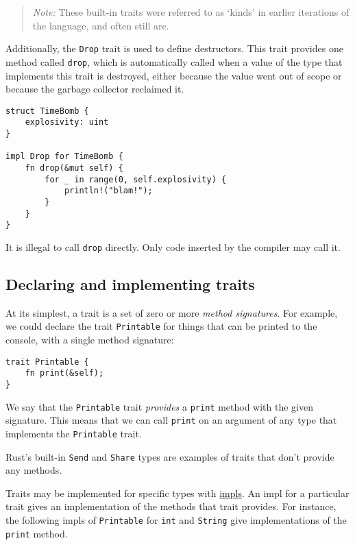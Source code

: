 \documentclass[]{article}
\begin{document}
\begin{quote}
\emph{Note:} These built-in traits were referred to as `kinds' in
earlier iterations of the language, and often still are.
\end{quote}

Additionally, the \texttt{Drop} trait is used to define destructors.
This trait provides one method called \texttt{drop}, which is
automatically called when a value of the type that implements this trait
is destroyed, either because the value went out of scope or because the
garbage collector reclaimed it.

\begin{verbatim}
struct TimeBomb {
    explosivity: uint
}

impl Drop for TimeBomb {
    fn drop(&mut self) {
        for _ in range(0, self.explosivity) {
            println!("blam!");
        }
    }
}
\end{verbatim}

It is illegal to call \texttt{drop} directly. Only code inserted by the
compiler may call it.

\subsection{Declaring and implementing
traits}\label{declaring-and-implementing-traits}

At its simplest, a trait is a set of zero or more \emph{method
signatures}. For example, we could declare the trait \texttt{Printable}
for things that can be printed to the console, with a single method
signature:

\begin{verbatim}
trait Printable {
    fn print(&self);
}
\end{verbatim}

We say that the \texttt{Printable} trait \emph{provides} a
\texttt{print} method with the given signature. This means that we can
call \texttt{print} on an argument of any type that implements the
\texttt{Printable} trait.

Rust's built-in \texttt{Send} and \texttt{Share} types are examples of
traits that don't provide any methods.

Traits may be implemented for specific types with
\hyperref[methods]{impls}. An impl for a particular trait gives an
implementation of the methods that trait provides. For instance, the
following impls of \texttt{Printable} for \texttt{int} and
\texttt{String} give implementations of the \texttt{print} method.
\end{document}
